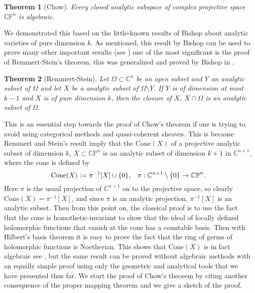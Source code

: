 \documentclass[12pt,twoside,a4paper]{report}
\newtheorem{theorem}{Theorem}[section]
\newcommand{\co}{\ensuremath{\mathbb C }}
\newcommand{\con}{\ensuremath{\mathbb{C}^n}}
\newcommand{\cp}{\ensuremath{\mathbb{CP}}}
\begin{document}
\begin{theorem}[Chow]\label{Chow}
        Every closed analytic subspace of complex projective space $\cp^{n}$ is algebraic.
\end{theorem}
\noindent We demonstrated this based on the little-known results of Bishop about analytic varieties of pure dimension $k$.
\noindent As mentioned, this result by Bishop can be used to prove many other important
results (see \cite{Stolzenberg}) one of the most significant is the proof of
Remmert-Stein's theorem, this was generalized and proved by Bishop in
\cite{Bishop}.

\begin{theorem}[Remmert-Stein]\label{Rem-Stein}
        Let $\Omega\subset\con$ be an open subset and $Y$ an analytic subset
        of $\Omega$ and let $X$ be a analytic subset of
        $\Omega\setminus Y$. If $Y$ is of dimension at most $k-1$ and $X$ is of pure dimension $k$,
        then the closure of $X$, $\overline{X}\cap\Omega$ is an analytic subset of $\Omega$.
\end{theorem}
This is an essential step towards the proof of Chow's theorem if one is trying to avoid using categorical methods and
quasi-coherent sheaves. This is because Remmert and Stein's result imply that the $\textrm{Cone}(X)$ of a projective analytic
subset of dimension $k$, $X\subset\cp^n$ is an analytic subset of dimension $k+1$ in $\co^{n+1}$, where the cone is defined by
\begin{equation}
\textrm{Cone}(X):=\pi^{-1}[X]\cup\lbrace0\rbrace,\hspace{0.3cm}\pi:\co^{n+1}\setminus\lbrace 0\rbrace\rightarrow\cp^n.
\end{equation}
\noindent Here $\pi$ is the usual projection of $\co^{n+1}$ on to the
projective space, so clearly $\textrm{Cone}(X)=\overline{\pi^{-1}[X]}$, and since $\pi$
is an analytic projection, $\pi^{-1}[X]$ is an analytic subset. Then from this
point on, the classical proof is to use the fact that the cone is homothetic-invariant to
show that the ideal of locally defined holomorphic functions that vanish at the
cone has a countable basis. Then with Hilbert's basis theorem it is easy to prove the
fact that the ring of germs of holomorphic functions is Noetherian. This shows
that $\textrm{Cone}(X)$ is in fact algebraic see \cite{Chirka}, but the same result can
be proved without algebraic methods with an equally simple proof using only
the geometric and analytical tools that we have presented thus far.  We start
the proof of Chow's theorem by citing another consequence of the proper mapping
theorem and we give a sketch of the proof.
\end{document}
